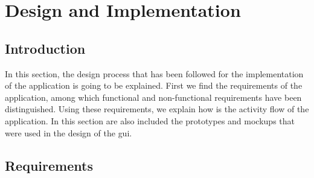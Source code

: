 \chapter{Design and Implementation}
\label{design}


\section{Introduction}
In this section, the design process that has been followed for the implementation of the application is going to be explained. First we find the requirements of the application, among which functional and non-functional requirements have been distinguished. Using these requirements, we explain how is the activity flow of the application. In this section are also included the prototypes and mockups that were used in the design of the \gls{gui}. 

\section{Requirements}

